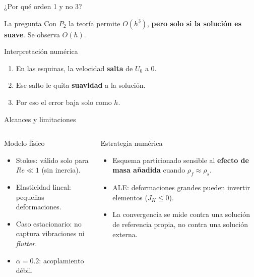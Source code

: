 \begin{frame}{¿Por qué orden 1 y no 3?}
  \begin{alertblock}{La pregunta}
    Con $P_2$ la teoría permite $O(h^3)$, \textbf{pero solo si la solución es suave}. Se observa $O(h)$.
  \end{alertblock}
  \vspace{0.5em}
  \begin{block}{Interpretación numérica}
    \begin{enumerate}
      \item En las esquinas, la velocidad \textbf{salta} de $U_0$ a $0$.
      \item Ese salto le quita \textbf{suavidad} a la solución.
      \item Por eso el error baja solo como $h$.
    \end{enumerate}
  \end{block}
  \vspace{0.5em}
\end{frame}
\begin{frame}{Alcances y limitaciones}
  \begin{columns}[T]
      \begin{block}{Modelo físico}
        \begin{itemize}\small
          \item Stokes: válido solo para $Re \ll 1$ (sin inercia).
          \item Elasticidad lineal: pequeñas deformaciones.
          \item Caso estacionario: no captura vibraciones ni \textit{flutter}.
          \item $\alpha = 0.2$: acoplamiento débil.
        \end{itemize}
      \end{block}
      \begin{block}{Estrategia numérica}
        \begin{itemize}\small
          \item Esquema particionado sensible al \textbf{efecto de masa añadida} cuando $\rho_f \approx \rho_s$.
          \item ALE: deformaciones grandes pueden invertir elementos ($J_K\le0$).
          \item La convergencia se mide contra una solución de referencia propia, no contra una solución externa.
        \end{itemize}
      \end{block}
  \end{columns}
\end{frame}
